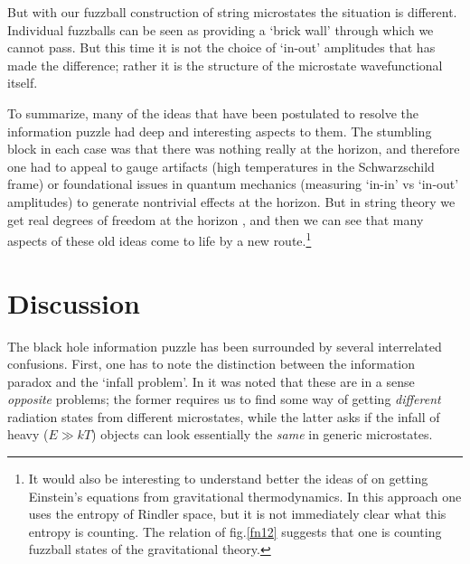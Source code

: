 \documentclass[12pt]{article}
\begin{document}
But with our fuzzball construction of string microstates the situation is different. Individual fuzzballs can be seen as providing a `brick wall' through which we cannot pass. But this time it is not the choice of `in-out' amplitudes that has made the difference; rather it is the structure of the microstate wavefunctional itself.

To summarize, many of the ideas that have been postulated to resolve the information puzzle had deep and interesting aspects to them. The stumbling block in each case was that there was nothing really at the horizon, and therefore one had to appeal to gauge artifacts (high temperatures in the Schwarzschild frame) or foundational issues in quantum mechanics (measuring `in-in' vs `in-out' amplitudes) to generate nontrivial effects at the horizon. But in string theory we get real degrees of freedom at the horizon \cite{membrane}, and then we can see that many aspects of these old ideas come to life by a new route.\footnote{It would also be interesting to understand better the ideas of \cite{jacobson} on getting Einstein's equations from gravitational thermodynamics. In this approach one uses the entropy of Rindler space, but it is not immediately clear what this entropy is counting. The relation of fig.\ref{fn12} suggests that one is counting fuzzball states of the gravitational theory.}
 
 
\section{Discussion}

The black hole information puzzle has been surrounded by several interrelated confusions. First, one has to note the distinction between the information paradox and the `infall problem'. In \cite{mathurrecent} it was noted that these are in a sense {\it opposite} problems; the former requires us to find some way of getting {\it different} radiation states from different microstates, while the latter asks if the infall of heavy ($E\gg kT$) objects can look essentially the {\it same} in generic microstates. 
\end{document}
